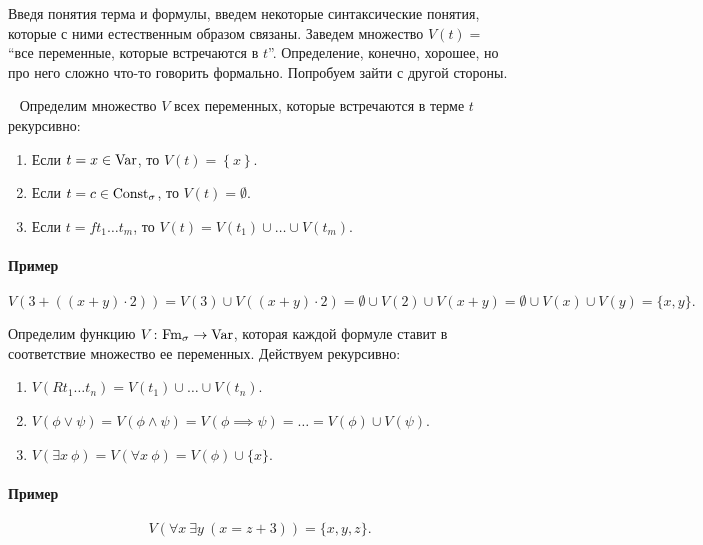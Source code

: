 Введя понятия терма и формулы, введем некоторые синтаксические понятия, которые с ними естественным образом связаны.
Заведем множество $V(t) = $ \enquote{все переменные, которые встречаются в $t$}.
Определение, конечно, хорошее, но про него сложно что-то говорить формально.
Попробуем зайти с другой стороны.
\begin{definition}~ \label{def::variables-in-term}
    Определим множество $V$ всех переменных, которые встречаются в терме $t$ рекурсивно:
    \begin{enumerate}
        \item Если $t = x \in \mathrm{Var}$, то $V(t) = \left\{x\right\}$.
        \item Если $t = c \in \mathrm{Const}_{\sigma}$, то $V(t) = \emptyset$.
        \item Если $t = f t_{1} \ldots t_{m}$, то $V(t) = V(t_{1}) \cup \ldots \cup V(t_{m})$.
    \end{enumerate}
\end{definition}

\paragraph{Пример}
$$
    V(3 + ((x + y) \cdot 2)) = V(3) \cup V((x + y) \cdot 2) = \emptyset \cup V(2) \cup V(x + y) = \emptyset \cup V(x) \cup V(y) = \{x, y\}.
$$

\begin{definition}
    Определим функцию $V \colon \mathrm{Fm}_{\sigma} \to \mathrm{Var}$, которая каждой формуле ставит в соответствие множество ее переменных.
    Действуем рекурсивно:
    \begin{enumerate}
        \item $V(R t_{1} \ldots t_{n}) = V(t_{1}) \cup \ldots \cup V(t_{n})$.
        \item $V(\phi \lor \psi) = V(\phi \land \psi) = V(\phi \implies \psi) = \ldots = V(\phi) \cup V(\psi)$.
        \item $V(\exists x~\phi) = V(\forall x~\phi) = V(\phi) \cup \{x\}$.
    \end{enumerate}
\end{definition}

\paragraph{Пример}
$$
    V(\forall x~ \exists y~ (x = z + 3)) = \{x, y, z\}.

$$

